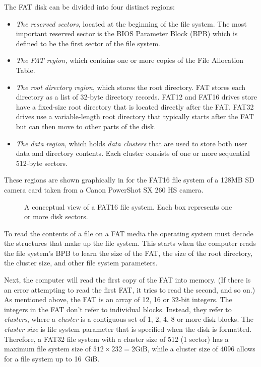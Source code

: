 The FAT disk can be divided into four distinct regions:
\begin{itemize}
\item \emph{The reserved sectors}, located at the beginning of the file
  system. The most important reserved sector is the BIOS Parameter
  Block (BPB) which is defined to be the first sector of the file system.
\item \emph{The FAT region,} which contains one or more copies of the
  File Allocation Table. 
\item \emph{The root directory region}, which stores the root
  directory. FAT stores each directory as
  a list of 32-byte directory records. FAT12 and FAT16 drives store have a
  fixed-size root directory that is located directly after the
  FAT. FAT32 drives use a variable-length root directory that
  typically starts after the FAT but can then move to other parts of
  the disk.
\item \emph{The data region}, which holds \emph{data
  clusters} that are used to store both user data and
  directory contents. Each cluster consists of one  or more
  sequential 512-byte sectors. 
\end{itemize}

These regions are shown graphically in  for the
FAT16 file system of a 128MB SD camera card taken from a Canon
PowerShot SX 260 HS camera.

\begin{figure}
\caption{A conceptual view of a FAT16 file system. Each box
  represents one or more disk sectors.\label{fig:fat16}}
\begin{center}

\end{center}
\end{figure}

To read the contents of a file on a FAT media the operating system
must decode the structures that make up the file system. This starts
when the computer reads the file system's BPB
to learn the size of the FAT, the size of the root directory, the
cluster size, and other file system parameters. 

Next, the computer will read the first copy of the FAT into
memory. (If there is an error attempting to read the first FAT, it
tries to read the second, and so on.) As mentioned above, the FAT is
an array of 12, 16 or 32-bit integers.  The integers in the FAT don't refer to individual blocks. Instead,
they refer to \emph{clusters}, where a  \emph{cluster} is a contiguous
set of 1, 2, 4, 8 or more disk blocks. The \emph{cluster size} is
file system parameter that is specified when the disk is
formatted. Therefore, a FAT32 file system with a cluster size of 512
(1 sector) has
a maximum file system size of $512\times2{32}=2\textrm{GiB}$, while a
cluster size of 4096 allows for a file system up to 16~GiB. 

